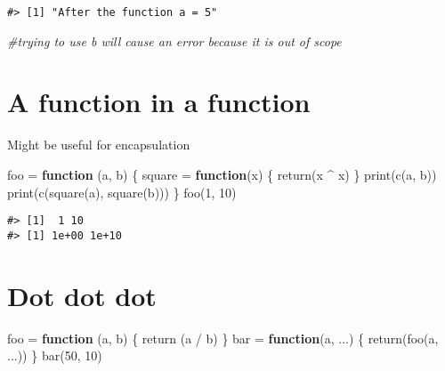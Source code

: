 \documentclass[
]{book}
\newenvironment{Shaded}{\begin{snugshade}}{\end{snugshade}}
\newcommand{\CommentTok}[1]{\textcolor[rgb]{0.56,0.35,0.01}{\textit{#1}}}
\newcommand{\ControlFlowTok}[1]{\textcolor[rgb]{0.13,0.29,0.53}{\textbf{#1}}}
\newcommand{\DecValTok}[1]{\textcolor[rgb]{0.00,0.00,0.81}{#1}}
\newcommand{\FunctionTok}[1]{\textcolor[rgb]{0.00,0.00,0.00}{#1}}
\newcommand{\NormalTok}[1]{#1}
\newcommand{\OtherTok}[1]{\textcolor[rgb]{0.56,0.35,0.01}{#1}}
\newcommand{\SpecialCharTok}[1]{\textcolor[rgb]{0.00,0.00,0.00}{#1}}
\begin{document}
\begin{verbatim}
#> [1] "After the function a = 5"
\end{verbatim}

\begin{Shaded}
\begin{Highlighting}[]
\CommentTok{\#trying to use \textasciigrave{}b\textasciigrave{} will cause an error because it is out of scope}
\end{Highlighting}
\end{Shaded}

\hypertarget{a-function-in-a-function}{%
\section{A function in a function}\label{a-function-in-a-function}}

Might be useful for encapsulation

\begin{Shaded}
\begin{Highlighting}[]
\NormalTok{foo }\OtherTok{=} \ControlFlowTok{function}\NormalTok{ (a, b) \{}
\NormalTok{  square }\OtherTok{=} \ControlFlowTok{function}\NormalTok{(x) \{}
    \FunctionTok{return}\NormalTok{(x }\SpecialCharTok{\^{}}\NormalTok{ x)}
\NormalTok{  \}}
  \FunctionTok{print}\NormalTok{(}\FunctionTok{c}\NormalTok{(a, b))}
  \FunctionTok{print}\NormalTok{(}\FunctionTok{c}\NormalTok{(}\FunctionTok{square}\NormalTok{(a), }\FunctionTok{square}\NormalTok{(b)))}
\NormalTok{\}}
\FunctionTok{foo}\NormalTok{(}\DecValTok{1}\NormalTok{, }\DecValTok{10}\NormalTok{)}
\end{Highlighting}
\end{Shaded}

\begin{verbatim}
#> [1]  1 10
#> [1] 1e+00 1e+10
\end{verbatim}

\hypertarget{dot-dot-dot}{%
\section{Dot dot dot}\label{dot-dot-dot}}

\begin{Shaded}
\begin{Highlighting}[]
\NormalTok{foo }\OtherTok{=} \ControlFlowTok{function}\NormalTok{ (a, b) \{}
  \FunctionTok{return}\NormalTok{ (a }\SpecialCharTok{/}\NormalTok{ b)}
\NormalTok{\}}
\NormalTok{bar }\OtherTok{=} \ControlFlowTok{function}\NormalTok{(a, ...) \{}
  \FunctionTok{return}\NormalTok{(}\FunctionTok{foo}\NormalTok{(a, ...))}
\NormalTok{\}}
\FunctionTok{bar}\NormalTok{(}\DecValTok{50}\NormalTok{, }\DecValTok{10}\NormalTok{)}
\end{Highlighting}
\end{Shaded}
\end{document}
